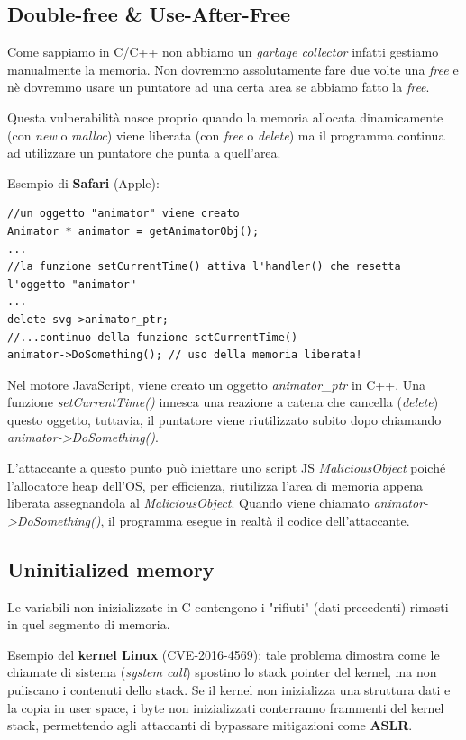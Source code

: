 \subsection{Double-free \& Use-After-Free}
Come sappiamo in C/C++ non abbiamo un \textit{garbage collector} infatti gestiamo
manualmente la memoria. Non dovremmo assolutamente fare due volte una \textit{free} e
nè dovremmo usare un puntatore ad una certa area se abbiamo fatto la \textit{free}.

Questa vulnerabilità nasce proprio quando la memoria allocata dinamicamente 
(con \textit{new} o \textit{malloc}) viene liberata (con \textit{free} o 
\textit{delete}) ma il programma continua ad utilizzare un puntatore che punta 
a quell'area.

Esempio di \textbf{Safari} (Apple):

\begin{lstlisting}
//un oggetto "animator" viene creato
Animator * animator = getAnimatorObj();
...
//la funzione setCurrentTime() attiva l'handler() che resetta l'oggetto "animator"
...
delete svg->animator_ptr;
//...continuo della funzione setCurrentTime()
animator->DoSomething(); // uso della memoria liberata!
\end{lstlisting}

Nel motore JavaScript, viene creato un oggetto \textit{animator\_ptr} in C++. 
Una funzione \textit{setCurrentTime()} innesca una reazione a catena che 
cancella (\textit{delete}) questo oggetto, tuttavia, il puntatore viene 
riutilizzato subito dopo chiamando \textit{animator->DoSomething()}.

L'attaccante a questo punto può iniettare uno script JS \textit{MaliciousObject} poiché 
l'allocatore heap dell'OS, per efficienza, riutilizza l'area di memoria 
appena liberata assegnandola al \textit{MaliciousObject}. Quando viene 
chiamato \textit{animator->DoSomething()}, il programma esegue in realtà 
il codice dell'attaccante.

\subsection{Uninitialized memory}

Le variabili non inizializzate in C contengono i "rifiuti" (dati precedenti) 
rimasti in quel segmento di memoria.

Esempio del \textbf{kernel Linux} (CVE-2016-4569): tale problema dimostra 
come le chiamate di sistema (\textit{system call}) spostino lo stack 
pointer del kernel, ma non puliscano i contenuti dello stack. Se il kernel 
non inizializza una struttura dati e la copia in user space, i byte non 
inizializzati conterranno frammenti del kernel stack, permettendo agli 
attaccanti di bypassare mitigazioni come \textbf{ASLR}.

